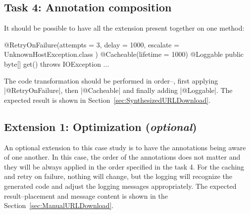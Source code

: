 \subsection{Task 4: Annotation composition}

It should be possible to have all the extension present together on one method:
%
\begin{javacode}
@RetryOnFailure(attempts = 3, delay = 1000, escalate = { UnknownHostException.class })
@Cacheable(lifetime = 1000)
@Loggable
public byte[] get() throws IOException { ... }
\end{javacode}

The code transformation should be performed in order--\Ie, first applying \javainline|@RetryOnFailure|, then \javainline|@Cacheable| and finally adding \javainline|@Loggable|.
The expected result is shown in Section~\ref{sec:SynthesizedURLDownload}.

\subsection{Extension 1: Optimization (\emph{optional})}

An optional extension to this case study is to have the annotations being aware of one another.
In this case, the order of the annotations does not matter and they will be always applied in the order specified in the task 4.
For the caching and retry on failure, nothing will change, but the logging will recognize the generated code and adjust the logging messages appropriately.
The expected result--\Ie placement and message content is shown in the Section~\ref{sec:ManualURLDownload}.